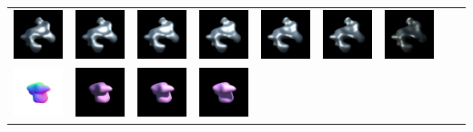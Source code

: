\begin{center}
\begin{longtable}{@{}c@{}c@{}c@{}c@{}c@{}c@{}c@{}c@{}c@{}}
\includegraphics[width=0.1\linewidth]{training/9_1.png} & \includegraphics[width=0.1\linewidth]{training/9_2.png} &
\includegraphics[width=0.1\linewidth]{training/9_3.png} & \includegraphics[width=0.1\linewidth]{training/9_4.png} &
\includegraphics[width=0.1\linewidth]{training/9_5.png} & \includegraphics[width=0.1\linewidth]{training/9_6.png} &
\includegraphics[width=0.1\linewidth]{training/9_7.png} \\
\includegraphics[width=0.1\linewidth]{training/10_gt.png} & \includegraphics[width=0.1\linewidth]{training/10_0.png} &
\includegraphics[width=0.1\linewidth]{training/10_1.png} & \includegraphics[width=0.1\linewidth]{training/10_2.png} &

\end{longtable}
\end{center}
